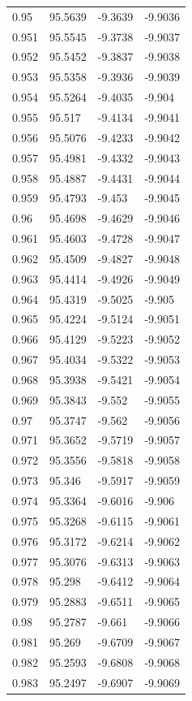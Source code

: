 \begin{tabular}{llll}
0.95 & 95.5639 & -9.3639 & -9.9036 \\
0.951 & 95.5545 & -9.3738 & -9.9037 \\
0.952 & 95.5452 & -9.3837 & -9.9038 \\
0.953 & 95.5358 & -9.3936 & -9.9039 \\
0.954 & 95.5264 & -9.4035 & -9.904 \\
0.955 & 95.517 & -9.4134 & -9.9041 \\
0.956 & 95.5076 & -9.4233 & -9.9042 \\
0.957 & 95.4981 & -9.4332 & -9.9043 \\
0.958 & 95.4887 & -9.4431 & -9.9044 \\
0.959 & 95.4793 & -9.453 & -9.9045 \\
0.96 & 95.4698 & -9.4629 & -9.9046 \\
0.961 & 95.4603 & -9.4728 & -9.9047 \\
0.962 & 95.4509 & -9.4827 & -9.9048 \\
0.963 & 95.4414 & -9.4926 & -9.9049 \\
0.964 & 95.4319 & -9.5025 & -9.905 \\
0.965 & 95.4224 & -9.5124 & -9.9051 \\
0.966 & 95.4129 & -9.5223 & -9.9052 \\
0.967 & 95.4034 & -9.5322 & -9.9053 \\
0.968 & 95.3938 & -9.5421 & -9.9054 \\
0.969 & 95.3843 & -9.552 & -9.9055 \\
0.97 & 95.3747 & -9.562 & -9.9056 \\
0.971 & 95.3652 & -9.5719 & -9.9057 \\
0.972 & 95.3556 & -9.5818 & -9.9058 \\
0.973 & 95.346 & -9.5917 & -9.9059 \\
0.974 & 95.3364 & -9.6016 & -9.906 \\
0.975 & 95.3268 & -9.6115 & -9.9061 \\
0.976 & 95.3172 & -9.6214 & -9.9062 \\
0.977 & 95.3076 & -9.6313 & -9.9063 \\
0.978 & 95.298 & -9.6412 & -9.9064 \\
0.979 & 95.2883 & -9.6511 & -9.9065 \\
0.98 & 95.2787 & -9.661 & -9.9066 \\
0.981 & 95.269 & -9.6709 & -9.9067 \\
0.982 & 95.2593 & -9.6808 & -9.9068 \\
0.983 & 95.2497 & -9.6907 & -9.9069 \\

\end{tabular}

